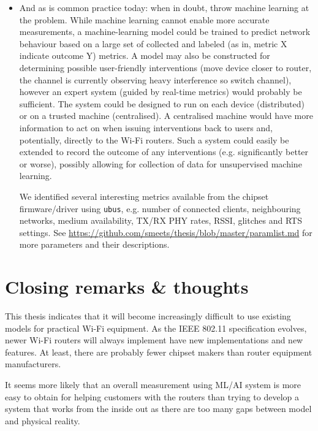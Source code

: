 \begin{itemize}
\item And as is common practice today: when in doubt, throw machine learning
at the problem. While machine learning cannot enable more accurate
measurements, a machine-learning model could be trained to predict network
behaviour based on a large set of collected and labeled (as in, metric X
indicate outcome Y) metrics. A model may also be constructed for determining
possible user-friendly interventions (move device closer to router, the
channel is currently observing heavy interference so switch channel), however
an expert system (guided by real-time metrics) would probably be sufficient.
The system could be designed to run on each device (distributed) or on a
trusted machine (centralised). A centralised machine would have more
information to act on when issuing interventions back to users and,
potentially, directly to the Wi-Fi routers. Such a system could easily be
extended to record the outcome of any interventions (e.g. significantly
better or worse), possibly allowing for collection of data for unsupervised
machine learning.

We identified several interesting metrics available from the chipset
firmware/driver using \texttt{ubus}, e.g. number of connected clients, neighbouring
networks, medium availability, TX/RX PHY  rates, RSSI, glitches and RTS settings. See \url{https://github.com/smeets/thesis/blob/master/paramlist.md} for more
parameters and their descriptions.


\end{itemize}

\section{Closing remarks \& thoughts}
This thesis indicates that it will become increasingly difficult to use existing
models for practical Wi-Fi equipment. As the IEEE 802.11 specification evolves, newer Wi-Fi routers will always implement have new implementations and new features. At least, there are probably fewer chipset makers than router equipment
manufacturers.

It seems more likely that an overall measurement using ML/AI system is more easy
to obtain for helping customers with the routers than trying to develop a system that works from the inside out as there are too many gaps between model and physical reality.  
